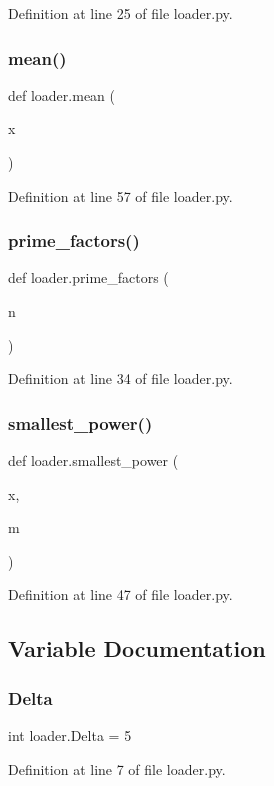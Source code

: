 Definition at line 25 of file loader.\+py.

\mbox{\label{namespaceloader_a5a4f338ed3c921c6c11cb7ce98fc29e0}} 
\subsubsection{mean()}
{\footnotesize\ttfamily def loader.\+mean (\begin{DoxyParamCaption}\item[{}]{x }\end{DoxyParamCaption})}



Definition at line 57 of file loader.\+py.

\mbox{\label{namespaceloader_aebe8a89cf18ac8b6e361f7a3ee23b81f}} 
\subsubsection{prime\+\_\+factors()}
{\footnotesize\ttfamily def loader.\+prime\+\_\+factors (\begin{DoxyParamCaption}\item[{}]{n }\end{DoxyParamCaption})}



Definition at line 34 of file loader.\+py.

\mbox{\label{namespaceloader_a56edcf60ba3f633ff6f725d719162784}} 
\subsubsection{smallest\+\_\+power()}
{\footnotesize\ttfamily def loader.\+smallest\+\_\+power (\begin{DoxyParamCaption}\item[{}]{x,  }\item[{}]{m }\end{DoxyParamCaption})}



Definition at line 47 of file loader.\+py.



\subsection{Variable Documentation}
\mbox{\label{namespaceloader_a0f5f3cab700f00bef16e1012b7dd20c2}} 
\subsubsection{Delta}
{\footnotesize\ttfamily int loader.\+Delta = 5}



Definition at line 7 of file loader.\+py.

